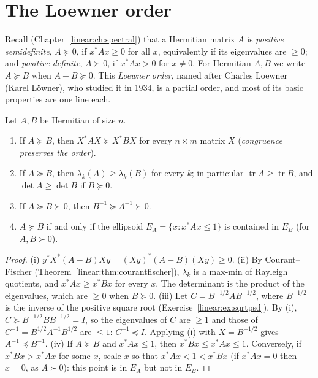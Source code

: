 \section{The Loewner order}

Recall (Chapter~\ref{linear:ch:spectral}) that a Hermitian matrix $A$ is \emph{positive semidefinite}, $A\succeq0$, if $x^*Ax\ge0$ for all $x$,
equivalently if its eigenvalues are $\ge0$; and \emph{positive definite}, $A\succ0$, if $x^*Ax>0$ for $x\ne0$. For Hermitian $A,B$ we
write $A\succeq B$ when $A-B\succeq0$. This \emph{Loewner order}, named after Charles Loewner (Karel L\"owner), who studied it in 1934,
is a partial order, and most of its basic properties are one line each.

\begin{proposition}\label{linear:prop:loewner}
Let $A,B$ be Hermitian of size $n$.
\begin{enumerate}[label=(\roman*)]
\item If $A\succeq B$, then $X^*AX\succeq X^*BX$ for every $n\times m$ matrix $X$ (\emph{congruence preserves the order}).
\item If $A\succeq B$, then $\lambda_k(A)\ge\lambda_k(B)$ for every $k$; in particular $\operatorname{tr}A\ge\operatorname{tr}B$, and
$\det A\ge\det B$ if $B\succeq0$.
\item If $A\succeq B\succ0$, then $B^{-1}\succeq A^{-1}\succ0$.
\item $A\succeq B$ if and only if the ellipsoid $E_A=\{x:x^*Ax\le1\}$ is contained in $E_B$ (for $A,B\succ0$).
\end{enumerate}
\end{proposition}
\begin{proof}
(i) $y^*X^*(A-B)Xy=(Xy)^*(A-B)(Xy)\ge0$. (ii) By Courant--Fischer (Theorem~\ref{linear:thm:courantfischer}), $\lambda_k$ is a max-min of
Rayleigh quotients, and $x^*Ax\ge x^*Bx$ for every $x$. The determinant is the product of the eigenvalues, which are $\ge0$ when
$B\succeq0$. (iii) Let $C=B^{-1/2}AB^{-1/2}$, where $B^{-1/2}$ is the inverse of the positive square root (Exercise~\ref{linear:ex:sqrtpsd}).
By (i), $C\succeq B^{-1/2}BB^{-1/2}=I$, so the eigenvalues of $C$ are $\ge1$ and those of $C^{-1}=B^{1/2}A^{-1}B^{1/2}$ are $\le1$: $C^{-1}
\preceq I$. Applying (i) with $X=B^{-1/2}$ gives $A^{-1}\preceq B^{-1}$. (iv) If $A\succeq B$ and $x^*Ax\le1$, then $x^*Bx\le x^*Ax\le1$.
Conversely, if $x^*Bx>x^*Ax$ for some $x$, scale $x$ so that $x^*Ax<1<x^*Bx$ (if $x^*Ax=0$ then $x=0$, as $A\succ0$): this point is
in $E_A$ but not in $E_B$.
\end{proof}

